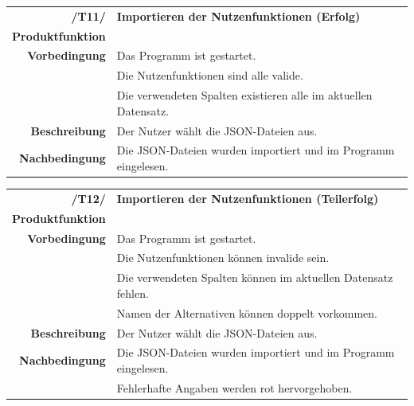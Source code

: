 \documentclass{article}
\begin{document}
\begin{table}[H]
\begin{tabularx}{\textwidth}{rX}
\vspace{1mm}
\textbf{/T11/}         & \textbf{Importieren der Nutzenfunktionen (Erfolg)} \\ \vspace{1mm}
\textbf{Produktfunktion} & \nameref{sec:f:Alternativen importieren} \\ \vspace{1mm}
\textbf{Vorbedingung}  & Das Programm ist gestartet. \\ & Die Nutzenfunktionen sind alle valide. \\ & Die verwendeten Spalten existieren alle im aktuellen Datensatz. \\
\vspace{1mm}
\textbf{Beschreibung}  & Der Nutzer wählt die JSON-Dateien aus. \\
\textbf{Nachbedingung} & Die JSON-Dateien wurden importiert und im Programm eingelesen.
\end{tabularx}
\end{table}

\begin{table}[H]
\begin{tabularx}{\textwidth}{rX}
\vspace{1mm}
\textbf{/T12/}         & \textbf{Importieren der Nutzenfunktionen (Teilerfolg)} \\ \vspace{1mm}
\textbf{Produktfunktion} & \nameref{sec:f:Alternativen importieren} \\ \vspace{1mm}
\textbf{Vorbedingung}  & Das Programm ist gestartet. \\ & Die Nutzenfunktionen können invalide sein. \\ & Die verwendeten Spalten können im aktuellen Datensatz fehlen. \\ & Namen der Alternativen können doppelt vorkommen.
\vspace{1mm} \\
\textbf{Beschreibung}  & Der Nutzer wählt die JSON-Dateien aus. \\
\textbf{Nachbedingung} & Die JSON-Dateien wurden importiert und im Programm eingelesen. \\ & Fehlerhafte Angaben werden rot hervorgehoben.
\end{tabularx}
\end{table}
\end{document}
